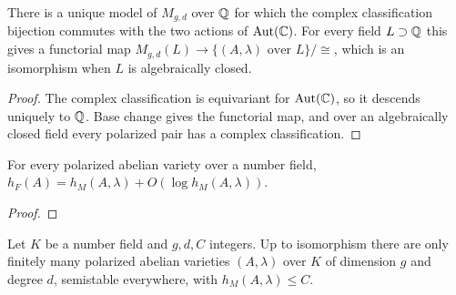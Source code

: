 \begin{theorem}
\label{thm:milne-siegel-moduli-rational-model}

There is a unique model of $M_{g,d}$ over $\mathbb{Q}$ for which the complex
classification bijection commutes with the two actions of $\operatorname{Aut}(\mathbb{C})$.
For every field $L\supset\mathbb{Q}$ this gives a functorial map
$M_{g,d}(L)\to\{(A,\lambda)\text{ over }L\}/\cong$, which is an isomorphism
when $L$ is algebraically closed.
\end{theorem}

\begin{proof}

The complex classification is equivariant for $\operatorname{Aut}(\mathbb{C})$, so it
descends uniquely to $\mathbb{Q}$.  Base change gives the functorial map, and over an
algebraically closed field every polarized pair has a complex classification.

\end{proof}


\begin{theorem}
\label{thm:milne-bounded-modular-height}

For every polarized abelian variety over a number field,
$h_F(A)=h_M(A,\lambda)+O(\log h_M(A,\lambda))$.
\end{theorem}

\begin{proof}
\notready

\end{proof}


\begin{theorem}
\label{thm:milne-modular-finiteness-fixed-level}

Let $K$ be a number field and $g,d,C$ integers.  Up to isomorphism there are
only finitely many polarized abelian varieties $(A,\lambda)$ over $K$ of
dimension $g$ and degree $d$, semistable everywhere, with $h_M(A,\lambda)\le C$.
\end{theorem}

